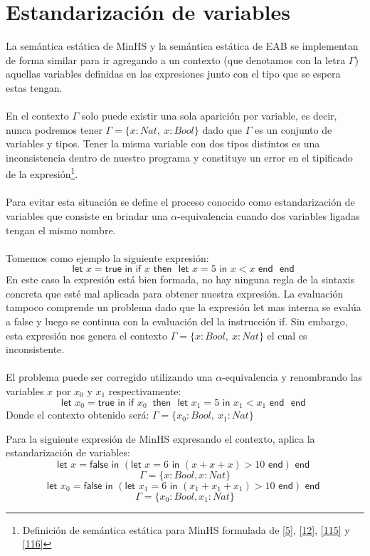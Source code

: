 \section{Estandarización de variables}
La semántica estática de \textsf{MinHS} y la semántica estática de \textsf{EAB} se implementan de forma similar para ir agregando a un contexto (que denotamos con la letra $\Gamma$) aquellas variables definidas en las expresiones junto con el tipo que se espera estas tengan.\\\\
En el contexto $\Gamma$ solo puede existir una sola aparición por variable, es decir, nunca podremos tener $\Gamma=\{x : Nat,\ x : Bool\}$ dado que $\Gamma$ es un conjunto de variables y tipos. Tener la misma variable con dos tipos distintos es una inconsistencia dentro de nuestro programa y constituye un error en el tipificado de la expresión\footnote{Definición de semántica estática para \textsf{MinHS} formulada de  \hyperlink{5}{[5]},  \hyperlink{12}{[12]}, \hyperlink{115}{[115]} y \hyperlink{116}{[116]}}.\\\\
Para evitar esta situación se define el proceso conocido como estandarización de variables que consiste en brindar una $\alpha$-equivalencia cuando dos variables ligadas tengan el mismo nombre.\\\\
Tomemos como ejemplo la siguiente expresión:
$$ \textsf{let } x = \textsf{true} \textsf{ in } \textsf{if } x \textsf{ then } \textsf{ let } x = 5 \textsf{ in } x < x \textsf{ end } \textsf{ end }$$
En este caso la expresión está bien formada, no hay ninguna regla de la sintaxis concreta que esté mal aplicada para obtener nuestra expresión. La evaluación tampoco comprende un problema dado que la expresión \textsf{let} mas interna se evalúa a \textsf{false} y luego se continua con la evaluación del la instrucción \textsf{if}. Sin embargo, esta expresión nos genera el contexto $\Gamma=\{x : Bool,\ x : Nat\}$ el cual es inconsistente.\\\\
El problema puede ser corregido utilizando una $\alpha$-equivalencia y renombrando las variables $x$ por $x_0$ y $x_1$ respectivamente:
$$ \textsf{let } x_0 = \textsf{true} \textsf{ in } \textsf{if } x_0\ \textsf{ then } \textsf{ let } x_1 = 5 \textsf{ in } x_1 < x_1 \textsf{ end } \textsf{ end }$$
Donde el contexto obtenido será: $\Gamma=\{x_0 : Bool,\ x_1 : Nat\}$

\begin{exercise}
    Para la siguiente expresión de \textsf{MinHS} expresando el contexto, aplica la estandarización de variables:
    $$\textsf{let } x = \textsf{false} \textsf{ in } (\textsf{let } x = 6 \textsf{ in } (x + x + x) > 10 \textsf{ end}) \textsf{ end }$$
      $$\Gamma=\{x  : Bool, x : Nat\}$$
    $$\textsf{let } x_0 = \textsf{false} \textsf{ in } (\textsf{let } x_1 = 6 \textsf{ in } (x_1 + x_1 + x_1) > 10 \textsf{ end}) \textsf{ end }$$
    $$\Gamma=\{x_0  : Bool, x_1 : Nat\}$$

\end{exercise} 

